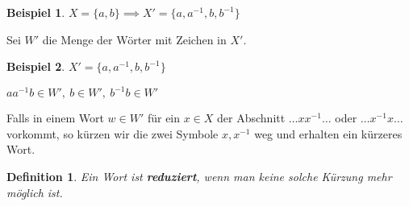 \documentclass{article}
\theoremstyle{plain}
\newtheorem{definition}{Definition}
\newtheorem{beispiel}{Beispiel}
\newcommand{\defn}[1]{\textbf{#1}}
\begin{document}
\begin{beispiel}
    $X=\{a,b\} \implies X'=\{a,a^{-1},b,b^{-1}\}$
\end{beispiel}
Sei $W'$ die Menge der Wörter mit Zeichen in $X'$.
\begin{beispiel}
    $X'=\{a,a^{-1},b,b^{-1}\}$
    
    $aa^{-1}b\in W',\ b\in W',\ b^{-1}b\in W'$
\end{beispiel}

Falls in einem Wort $w\in W'$ für ein $x\in X$ der Abschnitt $\ldots xx^{-1}\ldots$ oder $\ldots x^{-1}x\ldots$ vorkommt, so kürzen wir die zwei Symbole $x,x^{-1}$ weg und erhalten ein kürzeres Wort.

\begin{definition}
    Ein Wort ist \defn{reduziert}, wenn man keine solche Kürzung mehr möglich ist.
\end{definition}
\end{document}
